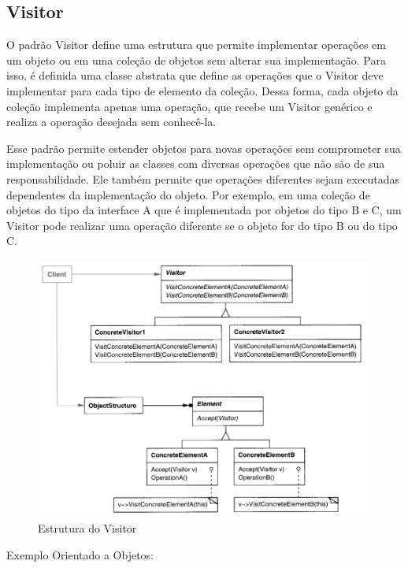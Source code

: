 \subsection{Visitor}

O padrão Visitor define uma estrutura que permite implementar 
operações em um objeto ou em uma coleção de objetos sem 
alterar sua implementação. Para isso, é definida uma classe 
abstrata que define as operações que o Visitor deve implementar 
para cada tipo de elemento da coleção. Dessa forma, cada 
objeto da coleção implementa apenas uma operação, que recebe 
um Visitor genérico e realiza a operação desejada sem 
conhecê-la.

Esse padrão permite estender objetos para novas operações 
sem comprometer sua implementação ou poluir as classes com 
diversas operações que não são de sua responsabilidade. Ele 
também permite que operações diferentes sejam executadas 
dependentes da implementação do objeto. Por exemplo, em uma 
coleção de objetos do tipo da interface A que é implementada 
por objetos do tipo B e C, um Visitor pode realizar uma 
operação diferente se o objeto for do tipo B ou do tipo C.

\begin{figure}[htb]
	\caption{\label{fig_grafico}Estrutura do Visitor}
	\begin{center}
	    \includegraphics[scale=0.5]{5_padroes-contexto-funcional/5.3_comportamentais/5.3.11_visitor/diagram.png}
	\end{center}
\end{figure}

Exemplo Orientado a Objetos:

